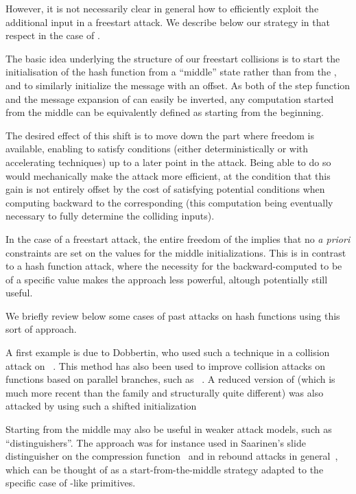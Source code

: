 However, it is not necessarily clear in general how to efficiently exploit the additional input in a freestart attack. We describe below our strategy in that respect
in the case of \shaone.

\medskip

The basic idea underlying the structure of our freestart collisions is to start the initialisation of the hash function from a ``middle'' state rather than from the \iv,
and to similarly initialize the message with an offset. As both of the step function and the message expansion of \shaone can easily be inverted, any computation started
from the middle can be equivalently defined as starting from the beginning.

The desired effect of this shift is to move down the part where freedom is available, enabling to satisfy conditions (either deterministically or with accelerating techniques)
up to a later point in the attack. Being able to do so would mechanically make the attack more efficient, at the condition that this gain is not entirely offset by the cost
of satisfying potential conditions when computing backward to the corresponding \iv (this computation being eventually necessary to fully determine the colliding inputs).

In the case of a freestart attack, the entire freedom of the \iv implies that no \emph{a priori} constraints are set on the values for the middle initializations. This is in contrast to a hash function attack, where
the necessity for the backward-computed \iv to be of a specific value makes the approach less powerful, altough potentially still useful.

We briefly review below some cases of past attacks on hash functions using this sort of approach.

\medskip

A first example is due to Dobbertin, who used such a technique in a collision attack on \mdfour~\cite{DBLP:conf/fse/Dobbertin96}.
This method has also been used to improve collision attacks on functions based on parallel branches, such as \ripemdote~\cite{DBLP:conf/eurocrypt/LandelleP13}.
A reduced version of \groestl (which is much more recent than the \mdsha family and structurally quite different) was also attacked by using such a shifted initialization~\cite{DBLP:conf/fse/MendelRS14}

Starting from the middle may also be useful in weaker attack models, such as ``distinguishers''. The approach was for instance used in
Saarinen's slide distinguisher on the \shaone compression function~\cite{DBLP:conf/fse/Saarinen03} and in
rebound attacks in general~\cite{DBLP:conf/fse/MendelRST09}, which can be thought of as a start-from-the-middle strategy adapted to the specific case of \aes-like primitives.


